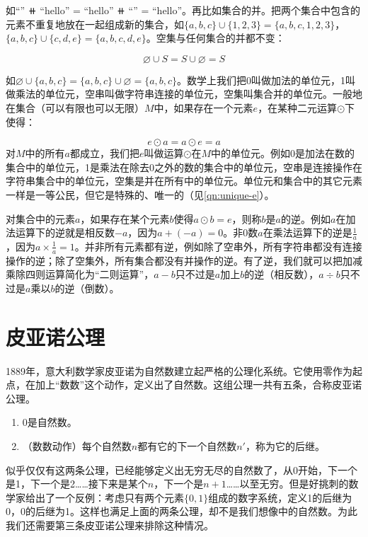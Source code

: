 \documentclass[b5paper]{ctexart}
\begin{document}
如``'' $\doubleplus$ ``hello'' = ``hello'' $\doubleplus$ ``'' = ``hello''。再比如集合的并。把两个集合中包含的元素不重复地放在一起组成新的集合，如$\{a, b, c\} \cup \{1, 2, 3\} = \{a, b, c, 1, 2, 3\}$，$\{a, b, c\} \cup \{c, d, e\} = \{a, b, c, d, e\}$。空集与任何集合的并都不变：

\[
\varnothing \cup S = S \cup \varnothing = S
\]

如$\varnothing \cup \{a, b, c\} = \{a, b, c\} \cup \varnothing = \{a, b, c\}$。数学上我们把0叫做加法的单位元，1叫做乘法的单位元，空串叫做字符串连接的单位元，空集叫集合并的单位元。一般地在集合（可以有限也可以无限）$M$中，如果存在一个元素$e$，在某种二元运算$\odot$下使得：

\[
  e \odot a = a \odot e = a
\]
对$M$中的所有$a$都成立，我们把$e$叫做运算$\odot$在$M$中的单位元。例如0是加法在数的集合中的单位元，1是乘法在除去0之外的数的集合中的单位元，空串是连接操作在字符串集合中的单位元，空集是并在所有中的单位元。单位元和集合中的其它元素一样是一等公民，但它是特殊的、唯一的（见\cref{qn:unique-e}）。

 
对集合中的元素$a$，如果存在某个元素$b$使得$a \odot b = e$，则称$b$是$a$的逆。例如$a$在加法运算下的逆就是相反数$-a$，因为$a + (-a) = 0$。非0数$a$在乘法运算下的逆是$\frac{1}{a}$，因为$a \times \frac{1}{a} = 1$。并非所有元素都有逆，例如除了空串外，所有字符串都没有连接操作的逆；除了空集外，所有集合都没有并操作的逆。有了逆，我们就可以把加减乘除四则运算简化为“二则运算”，$a - b$只不过是$a$加上$b$的逆（相反数），$a \div b$只不过是$a$乘以$b$的逆（倒数）。

\section{皮亚诺公理}
\label{sec:peano-axioms}
1889年，意大利数学家皮亚诺为自然数建立起严格的公理化系统。它使用零作为起点，在加上“数数”这个动作，定义出了自然数。这组公理一共有五条，合称皮亚诺公理。

\begin{enumerate}[公理1)]
\item 0是自然数。
\item （数数动作）每个自然数$n$都有它的下一个自然数$n'$，称为它的后继。
\end{enumerate}

似乎仅仅有这两条公理，已经能够定义出无穷无尽的自然数了，从0开始，下一个是1，下一个是2……接下来是某个$n$，下一个是$n+1$……以至无穷。但是好挑刺的数学家给出了一个反例：考虑只有两个元素$\{0, 1\}$组成的数字系统，定义1的后继为0，0的后继为1。这样也满足上面的两条公理，却不是我们想像中的自然数。为此我们还需要第三条皮亚诺公理来排除这种情况。
\end{document}

